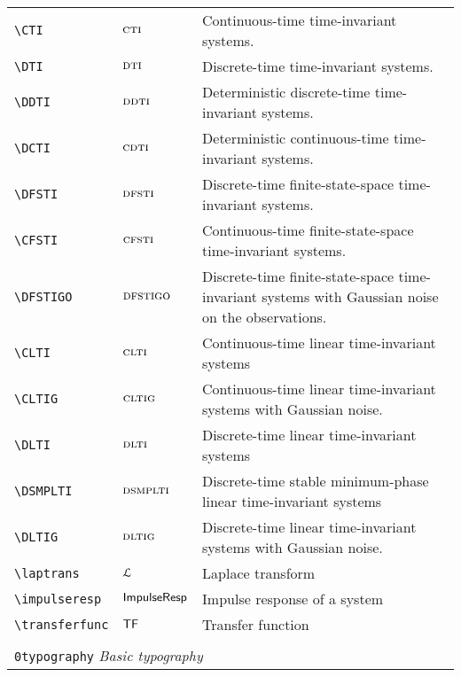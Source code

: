 \begin{longtable}{lll}
 \hline
{\color[rgb]{0.5,0.5,0.5}\texttt{\textbackslash CTI}} & $\textsc{cti}$ &  Continuous-time time-invariant systems.\\ 
 {\color[rgb]{0.5,0.5,0.5}\texttt{\textbackslash DTI}} & $\textsc{dti}$ &  Discrete-time time-invariant systems.\\ 
 {\color[rgb]{0.5,0.5,0.5}\texttt{\textbackslash DDTI}} & $\textsc{ddti}$ &  Deterministic discrete-time time-invariant systems.\\ 
 {\color[rgb]{0.5,0.5,0.5}\texttt{\textbackslash DCTI}} & $\textsc{cdti}$ &  Deterministic continuous-time time-invariant systems.\\ 
 {\color[rgb]{0.5,0.5,0.5}\texttt{\textbackslash DFSTI}} & $\textsc{dfsti}$ &  Discrete-time finite-state-space time-invariant systems.\\ 
 {\color[rgb]{0.5,0.5,0.5}\texttt{\textbackslash CFSTI}} & $\textsc{cfsti}$ &  Continuous-time finite-state-space time-invariant systems.\\ 
 {\color[rgb]{0.5,0.5,0.5}\texttt{\textbackslash DFSTIGO}} & $\textsc{dfstigo}$ &  Discrete-time finite-state-space time-invariant systems with Gaussian noise on the observations.\\ 
 {\color[rgb]{0.5,0.5,0.5}\texttt{\textbackslash CLTI}} & $\textsc{clti}$ &  Continuous-time linear time-invariant systems\\ 
 {\color[rgb]{0.5,0.5,0.5}\texttt{\textbackslash CLTIG}} & $\textsc{cltig}$ &  Continuous-time linear time-invariant systems with Gaussian noise.\\ 
 {\color[rgb]{0.5,0.5,0.5}\texttt{\textbackslash DLTI}} & $\textsc{dlti}$ &  Discrete-time linear time-invariant systems\\ 
 {\color[rgb]{0.5,0.5,0.5}\texttt{\textbackslash DSMPLTI}} & $\textsc{dsmplti}$ &  Discrete-time stable minimum-phase linear time-invariant systems\\ 
 {\color[rgb]{0.5,0.5,0.5}\texttt{\textbackslash DLTIG}} & $\textsc{dltig}$ &  Discrete-time linear time-invariant systems with Gaussian noise.\\ 
 {\color[rgb]{0.5,0.5,0.5}\texttt{\textbackslash laptrans}} & $\mathcal{L}$ &  Laplace transform\\ 
 {\color[rgb]{0.5,0.5,0.5}\texttt{\textbackslash impulseresp}} & $\mathsf{ImpulseResp}$ &  Impulse response of a system\\ 
 {\color[rgb]{0.5,0.5,0.5}\texttt{\textbackslash transferfunc}} & $\mathsf{TF}$ &  Transfer function\\ 
  &  & \\ 
 \multicolumn{3}{l}{{\color[rgb]{0.5,0.5,0.5}\texttt{0typography}} \emph{Basic typography}}\\ 

\end{longtable}
